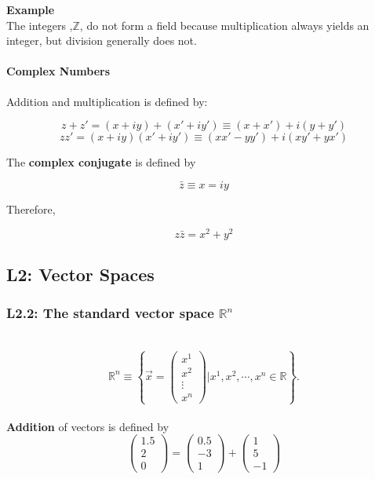 \documentclass[11pt, oneside]{article}   	%
\begin{document}
\textbf{Example} \\
The integers ,$\mathbb{Z}$, do not form a field because multiplication always yields an integer, but division generally does not. 

\paragraph{Complex Numbers} 

Addition and multiplication is defined by: 

\[ z + z' = (x + iy) + (x' + iy') \equiv (x+ x') + i(y + y') \] 
\[ zz' = (x+ iy)(x'+iy') \equiv (xx' - yy') + i(xy' + yx') \]

The \textbf{complex conjugate} is defined by

\[ \bar{z} \equiv x = iy \] 

Therefore, 

\[ z\bar{z} = x^2 + y^2 \]

\subsection{L2: Vector Spaces}

\subsubsection{L2.2: The standard vector space $\mathbb{R}^n$} \mbox{} \\
\[
\mathbb{R}^n \equiv
\left \{ \vec{x} = 
\begin{pmatrix}
x^1 \\ x^2 \\ \vdots \\ x^n
 \end{pmatrix} 
 \Bigg| x^1, x^2, \cdots, x^n \in \mathbb{R} \right\}.
 \] \\
 
 \textbf{Addition} of vectors is defined by \\
 
 \[ \begin{pmatrix} 
 1.5 \\ 2 \\ 0 \end{pmatrix} = \begin{pmatrix} 0.5 \\ -3 \\1 \end{pmatrix} + \begin{pmatrix}  1\\5\\-1 \end{pmatrix} \]\\
 
\end{document}
